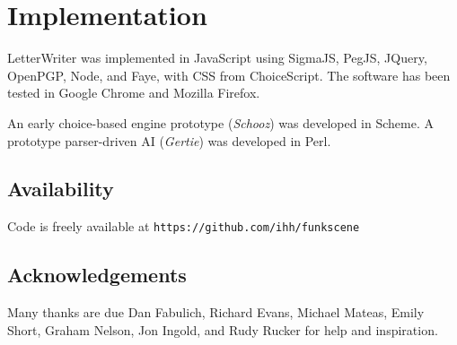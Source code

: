 \documentclass{acm_proc_article-sp}
\begin{document}
\section{Implementation}

LetterWriter was implemented in JavaScript
using SigmaJS, PegJS, JQuery, OpenPGP, Node, and Faye,
with CSS from ChoiceScript.
The software has been tested in Google Chrome and Mozilla Firefox.

An early choice-based engine prototype ({\em Schooz}) was developed in Scheme.
A prototype parser-driven AI ({\em Gertie}) was developed in Perl.


\subsection{Availability}

Code is freely available at
{\tt https://github.com/ihh/funkscene}


\subsection{Acknowledgements}

Many thanks are due Dan Fabulich, Richard Evans, Michael Mateas, Emily Short, Graham Nelson, Jon Ingold,
and Rudy Rucker for help and inspiration.




\balancecolumns
\end{document}
